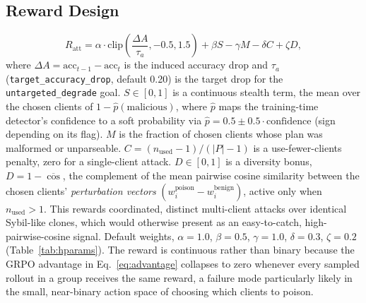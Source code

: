 \documentclass[conference,9pt]{IEEEtran}
\begin{document}
\subsection{Reward Design}
\label{sec:rewards}
\begin{equation}
R_{\mathrm{att}} = \alpha \cdot \mathrm{clip}\!\left(\frac{\Delta A}{\tau_a}, -0.5, 1.5\right) + \beta S - \gamma M - \delta C + \zeta D,
\label{eq:attacker_reward}
\end{equation}
where $\Delta A = \mathrm{acc}_{t-1} - \mathrm{acc}_t$ is the induced accuracy drop and $\tau_a$ (\texttt{target\_accuracy\_drop}, default 0.20) is the target drop for the \texttt{untargeted\_degrade} goal. $S \in [0,1]$ is a continuous stealth term, the mean over the chosen clients of $1-\hat p(\mathrm{malicious})$, where $\hat p$ maps the training-time detector's confidence to a soft probability via $\hat p = 0.5 \pm 0.5\cdot\mathrm{confidence}$ (sign depending on its flag). $M$ is the fraction of chosen clients whose plan was malformed or unparseable. $C=(n_{\mathrm{used}}-1)/(|P|-1)$ is a use-fewer-clients penalty, zero for a single-client attack. $D\in[0,1]$ is a diversity bonus, $D = 1 - \overline{\cos}$, the complement of the mean pairwise cosine similarity between the chosen clients' \emph{perturbation vectors} $(w^{\text{poison}}_i - w^{\text{benign}}_i)$, active only when $n_{\mathrm{used}}>1$. This rewards coordinated, distinct multi-client attacks over identical Sybil-like clones, which would otherwise present as an easy-to-catch, high-pairwise-cosine signal. Default weights, $\alpha{=}1.0$, $\beta{=}0.5$, $\gamma{=}1.0$, $\delta{=}0.3$, $\zeta{=}0.2$ (Table~\ref{tab:hparams}). The reward is continuous rather than binary because the GRPO advantage in Eq.~\eqref{eq:advantage} collapses to zero whenever every sampled rollout in a group receives the same reward, a failure mode particularly likely in the small, near-binary action space of choosing which clients to poison.
\end{document}
